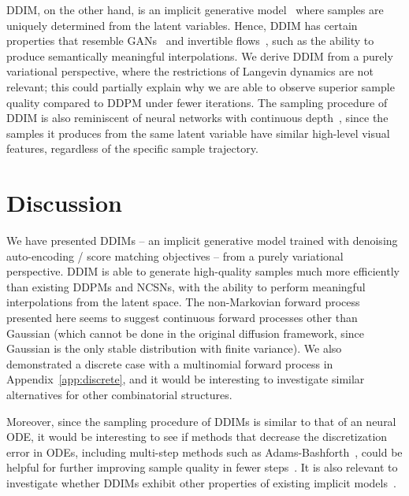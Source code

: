 DDIM, on the other hand, is an implicit generative model~\citep{mohamed2016learning} where samples are uniquely determined from the latent variables. Hence, DDIM has certain properties that resemble GANs~\citep{goodfellow2014generative} and invertible flows~\citep{dinh2016density}, such as the ability to produce semantically meaningful interpolations. We derive DDIM from a purely variational perspective, where the restrictions of Langevin dynamics are not relevant; this could partially explain why we are able to observe superior sample quality compared to DDPM under fewer iterations. The sampling procedure of DDIM is also reminiscent of neural networks with continuous depth~\citep{chen2018neural,grathwohl2018ffjord}, since the samples it produces from the same latent variable have similar high-level visual features, regardless of the specific sample trajectory.

\section{Discussion}
We have presented DDIMs -- an implicit generative model trained with denoising auto-encoding / score matching objectives -- from a purely variational perspective. DDIM is able to generate high-quality samples much more efficiently than existing DDPMs and NCSNs, with the ability to perform meaningful interpolations from the latent space. The non-Markovian forward process presented here seems to suggest  continuous forward processes other than Gaussian (which cannot be done in the original diffusion framework, since Gaussian is the only stable distribution with finite variance). We also demonstrated a discrete case with a multinomial forward process in Appendix~\ref{app:discrete}, and it would be interesting to investigate similar alternatives for other combinatorial structures.

Moreover, since the sampling procedure of DDIMs is similar to that of an neural ODE, it would be interesting to see if methods that decrease the discretization error in ODEs, including multi-step methods such as Adams-Bashforth~\citep{butcher2008numerical}, could be helpful for further improving sample quality in fewer steps~\citep{queiruga2020continuous}. It is also relevant to investigate whether DDIMs exhibit other properties of existing implicit models~\citep{bau2019seeing}.


